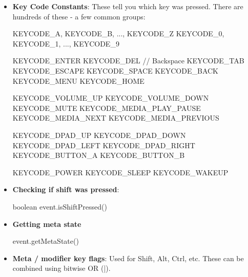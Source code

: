\documentclass{report}
\begin{document}
\begin{itemize}
        \item \textbf{Key Code Constants}: These tell you which key was pressed.
            \bigbreak \noindent 
            There are hundreds of these - a few common groups:
            \bigbreak \noindent 
            \begin{javacode}
                KEYCODE_A, KEYCODE_B, ..., KEYCODE_Z
                KEYCODE_0, KEYCODE_1, ..., KEYCODE_9
            \end{javacode}
            \bigbreak \noindent 
            \begin{javacode}
                KEYCODE_ENTER
                KEYCODE_DEL           // Backspace
                KEYCODE_TAB
                KEYCODE_ESCAPE
                KEYCODE_SPACE
                KEYCODE_BACK
                KEYCODE_MENU
                KEYCODE_HOME
            \end{javacode}
            \bigbreak \noindent 
            \begin{javacode}
                KEYCODE_VOLUME_UP
                KEYCODE_VOLUME_DOWN
                KEYCODE_MUTE
                KEYCODE_MEDIA_PLAY_PAUSE
                KEYCODE_MEDIA_NEXT
                KEYCODE_MEDIA_PREVIOUS
            \end{javacode}
            \bigbreak \noindent 
            \begin{javacode}
                KEYCODE_DPAD_UP
                KEYCODE_DPAD_DOWN
                KEYCODE_DPAD_LEFT
                KEYCODE_DPAD_RIGHT
                KEYCODE_BUTTON_A
                KEYCODE_BUTTON_B
            \end{javacode}
            \bigbreak \noindent 
            \begin{javacode}
                KEYCODE_POWER
                KEYCODE_SLEEP
                KEYCODE_WAKEUP
            \end{javacode}
        \item \textbf{Checking if shift was pressed}:
            \bigbreak \noindent 
            \begin{javacode}
            boolean event.isShiftPressed()
            \end{javacode}
        \item \textbf{Getting meta state}
            \bigbreak \noindent 
            \begin{javacode}
            event.getMetaState()
            \end{javacode}
        \item \textbf{Meta / modifier key flags}: Used for Shift, Alt, Ctrl, etc. These can be combined using bitwise OR (|).

\end{itemize}
\end{document}
